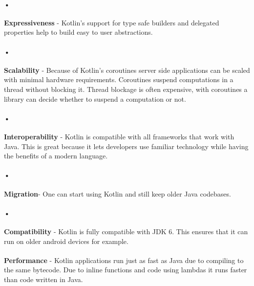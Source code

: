 \paragraph{•}
\textbf{Expressiveness} - Kotlin's support for type safe builders and delegated properties help to build easy to user abstractions. \paragraph{•}
\textbf{Scalability} - Because of Kotlin's coroutines server side applications can be scaled with minimal hardware requirements. Coroutines suspend computations in a thread without blocking it. Thread blockage is often expensive, with coroutines a library can decide whether to suspend a computation or not. \paragraph{•}
\textbf{Interoperability} - Kotlin is compatible with all frameworks that work with Java. This is great because it lets developers use familiar technology while having the benefits of a modern language. \paragraph{•}
\textbf{Migration}- One can start using Kotlin and still keep older Java codebases. \paragraph{•}
\textbf{Compatibility} - Kotlin is fully compatible with JDK 6. This ensures that it can run on older android devices for example. \paragraph{}
\textbf{Performance} - Kotlin applications run just as fast as Java due to compiling to the same bytecode. Due to inline functions and code using lambdas it runs faster than code written in Java.  

